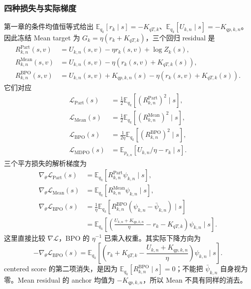 \documentclass[lang=cn,scheme=chinese,openany]{../book/elegantbook}
\begin{document}
\subsubsection*{四种损失与实际梯度}
第一章的条件均值恒等式给出 $\mathbb E_{q_k}[r_k\mid s]=-K_{qT,k}$、$\mathbb E_{q_k}[U_{k,n}\mid s]=-K_{qp,k,n}$。因此冻结 Mean target 为 $G_k=\eta(r_k+K_{qT,k})$，三个回归 residual 是
\begin{align}
R_{k,n}^{\mathrm{Part}}(s,v)&=U_{k,n}(s,v)-\eta r_k(s,v)+\log Z_k(s),
\label{eq:ch2-opd-full-part-simplified}\\
R_{k,n}^{\mathrm{Mean}}(s,v)&=U_{k,n}(s,v)-\eta(r_k(s,v)+K_{qT,k}(s)),
\label{eq:ch2-opd-full-mean-simplified}\\
R_{k,n}^{\mathrm{BPO}}(s,v)&=U_{k,n}(s,v)+K_{qp,k,n}(s)-\eta(r_k(s,v)+K_{qT,k}(s)).
\label{eq:ch2-opd-full-bpo-residual}
\end{align}
它们对应
\begin{align}
\mathcal L_{\mathrm{Part}}(s)&=\tfrac12\mathbb E_{q_k}[(R_{k,n}^{\mathrm{Part}})^2\mid s],\\
\mathcal L_{\mathrm{Mean}}(s)&=\tfrac12\mathbb E_{q_k}[(R_{k,n}^{\mathrm{Mean}})^2\mid s],\\
\mathcal L_{\mathrm{BPO}}(s)&=\tfrac1{2\eta}\mathbb E_{q_k}[(R_{k,n}^{\mathrm{BPO}})^2\mid s],
\label{eq:ch2-opd-full-bpo-simplified}\\
\mathcal L_{\mathrm{MDPO}}(s)&=\mathbb E_{p_{k,n}}[U_{k,n}/\eta-r_k\mid s].
\label{eq:ch2-opd-full-mdpo-simplified}
\end{align}
三个平方损失的解析梯度为
\begin{align}
\nabla_\theta\mathcal L_{\mathrm{Part}}(s)&=\mathbb E_{q_k}[R_{k,n}^{\mathrm{Part}}\psi_{k,n}\mid s],\\
\nabla_\theta\mathcal L_{\mathrm{Mean}}(s)&=\mathbb E_{q_k}[R_{k,n}^{\mathrm{Mean}}\psi_{k,n}\mid s],\\
\nabla_\theta\mathcal L_{\mathrm{BPO}}(s)&=\frac1\eta\mathbb E_{q_k}[R_{k,n}^{\mathrm{BPO}}(\psi_{k,n}-\bar\psi_{k,n})\mid s]\\
&=\mathbb E_{q_k}\left[\left(\frac{U_{k,n}+K_{qp,k,n}}\eta-r_k-K_{qT,k}\right)\psi_{k,n}\mid s\right].
\label{eq:ch2-opd-full-bpo-gradient-simplified}
\end{align}
这里直接比较 $\nabla\mathcal L$，BPO 的 $\eta^{-1}$ 已乘入权重。其实际下降方向为
\begin{equation}
-\nabla_\theta\mathcal L_{\mathrm{BPO}}(s)
=\mathbb E_{q_k}\left[\left(r_k+K_{qT,k}-\frac{U_{k,n}+K_{qp,k,n}}\eta\right)\psi_{k,n}\mid s\right].
\label{eq:ch2-opd-bpo-descent-expanded}
\end{equation}
centered score 的第二项消失，是因为 $\mathbb E_{q_k}[R_{k,n}^{\mathrm{BPO}}\mid s]=0$；不能把 $\bar\psi_{k,n}$ 自身视为零。Mean residual 的 anchor 均值为 $-K_{qp,k,n}$，所以 Mean 不具有同样的消去。
\end{document}
